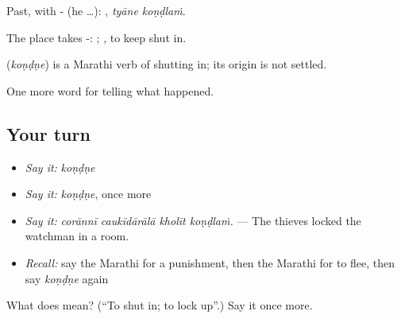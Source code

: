 Past, with - (he …):  , \emph{tyāne koṇḍlaṁ}.

The place takes -:  ;  , to keep shut in.

\begin{cousinweb}
\textbf{} (\emph{koṇḍṇe}) is a Marathi verb of shutting in; its origin is not settled.
\end{cousinweb}

\begin{grammarlens}[title={What you've built}]
One more word for telling what happened.
\end{grammarlens}

\subsection*{Your turn}
\begin{itemize}
\raggedright
  \item \emph{Say it:} \emph{koṇḍṇe}
  \item \emph{Say it:} \emph{koṇḍṇe}, once more
  \item \emph{Say it:} \emph{corānnī caukīdārālā kholīt koṇḍlaṁ.} — The thieves locked the watchman in a room.
  \item \emph{Recall:} say the Marathi for a punishment, then the Marathi for to flee, then say \emph{koṇḍṇe} again
\end{itemize}

\begin{tcolorbox}[breakable,colback=teal!4,colframe=teal!35!black,title={Before you move on}]
What does  mean? (\textquotedblleft{}To shut in; to lock up\textquotedblright{}.) Say it once more.
\end{tcolorbox}
